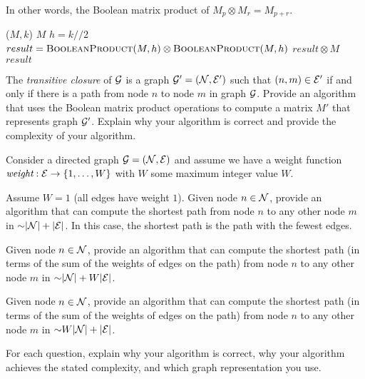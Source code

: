 \begin{problem}
\begin{questions}
In other words, the Boolean matrix product of $M_p \otimes M_r = M_{p+r}$.


\begin{myalgo}{($M, k$)}
    \RETURN $M$
  \ENDIF
  \STATE $h = k//2$
  \STATE $result = \textsc{BooleanProduct}(M, h) \otimes \textsc{BooleanProduct}(M, h)$ 
    \STATE $result \otimes M$ 
  \ENDIF
  \RETURN $result$
\end{myalgo}


\item The \emph{transitive closure} of $\mathcal{G}$ is a graph $\mathcal{G}' = (\mathcal{N}, \mathcal{E}')$ such that $(n, m) \in \mathcal{E}'$ if and only if there is a path from node $n$ to node $m$ in graph $\mathcal{G}$. Provide an algorithm that uses the Boolean matrix product operations to compute a matrix $M'$ that represents graph $\mathcal{G}'$. Explain why your algorithm is correct and provide the complexity of your algorithm.



\end{questions}
\end{problem}

\begin{problem}
Consider a directed graph $\mathcal{G} = (\mathcal{N}, \mathcal{E})$ and assume we have a weight function $\mathord{\textit{weight}} : \mathcal{E} \rightarrow \{1, \dots, W\}$ with $W$ some maximum integer value $W$.
\begin{questions}
\item Assume $W = 1$ (all edges have weight $1$). Given node $n \in \mathcal{N}$, provide an algorithm that can compute the shortest path from node $n$ to any other node $m$ in $\mathord{\sim}\lvert \mathcal{N} \rvert + \lvert \mathcal{E} \rvert$. In this case, the shortest path is the path with the fewest edges.
\item Given node $n \in \mathcal{N}$, provide an algorithm that can compute the shortest path (in terms of the sum of the weights of edges on the path) from node $n$ to any other node $m$ in $\mathord{\sim}\lvert \mathcal{N} \rvert + W\lvert \mathcal{E} \rvert$.
\item Given node $n \in \mathcal{N}$, provide an algorithm that can compute the shortest path (in terms of the sum of the weights of edges on the path) from node $n$ to any other node $m$ in $\mathord{\sim}W\lvert \mathcal{N} \rvert + \lvert \mathcal{E} \rvert$.
\end{questions}
For each question, explain why your algorithm is correct, why your algorithm achieves the stated complexity, and which graph representation you use.
\end{problem}

\SUBMITMSG{}
\DEFAULTGRADING{}

